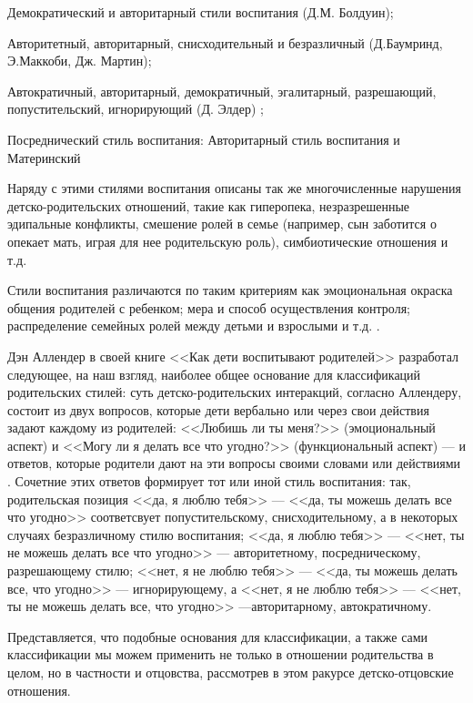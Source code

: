 \documentclass{../../common/thesisbyxetex}
\begin{document}
Демократический и авторитарный стили воспитания (Д.М. Болдуин);

Авторитетный, авторитарный, снисходительный и безразличный (Д.Баумринд, Э.Маккоби, Дж. Мартин);

Автократичный, авторитарный, демократичный, эгалитарный, разрешающий, попустительский, игнорирующий
(Д. Элдер) \cite{stil};

Посреднический стиль воспитания: Авторитарный стиль воспитания и Материнский \cite[281]{strat}

Наряду с этими стилями воспитания описаны так же многочисленные нарушения детско-родительских
отношений, такие как гиперопека,  незразрешенные эдипальные конфликты, смешение ролей в семье
(например, сын заботится о опекает мать, играя для нее родительскую роль), симбиотические отношения
и т.д.


Стили воспитания различаются по таким критериям как эмоциональная окраска общения родителей с
ребенком; мера и способ осуществления контроля; распределение семейных ролей между детьми и
взрослыми и т.д. \cite{stil}.

Дэн Аллендер в своей книге <<Как дети воспитывают родителей>> разработал следующее, на наш взгляд,
наиболее общее основание для классификаций родительских стилей: суть детско-родительских
интеракций, согласно Аллендеру, состоит из двух вопросов, которые дети вербально или
через свои действия задают каждому из родителей: <<Любишь ли ты меня?>> (эмоциональный аспект) и
<<Могу ли я делать все что угодно?>> (функциональный аспект) --- и ответов, которые родители
дают на эти вопросы своими словами или действиями \cite{den}. Сочетние этих ответов формирует тот
или иной стиль воспитания: так, родительская позиция <<да, я люблю тебя>> --- <<да, ты можешь делать
все что угодно>> соответсвует попустительскому, снисходительному, а в некоторых случаях
безразличному стилю воспитания; <<да, я люблю тебя>>  --- <<нет, ты не можешь делать все что
угодно>> --- авторитетному, посредническому, разрешающему стилю; <<нет, я не люблю тебя>> --- <<да,
ты можешь делать все, что угодно>>  --- игнорирующему, а  <<нет, я не люблю тебя>> --- <<нет, ты не
можешь делать все, что угодно>> ---авторитарному, автократичному.

Представляется, что подобные основания для классификации, а также сами классификации мы можем
применить не только в отношении родительства в целом, но в частности и отцовства, рассмотрев в этом
ракурсе детско-отцовские отношения.
\end{document}
